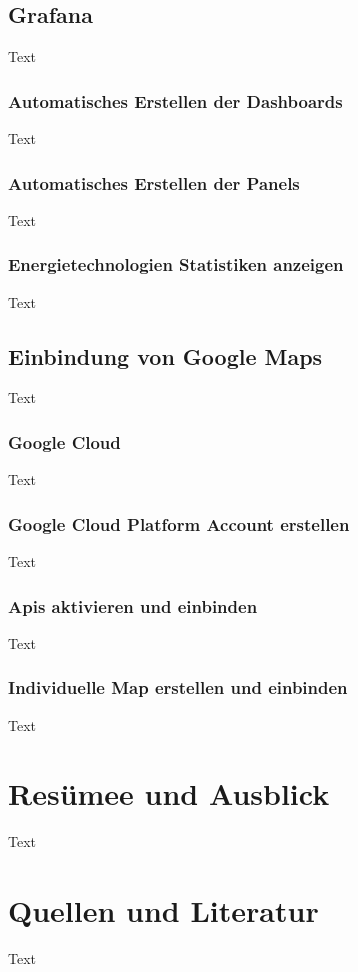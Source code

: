 \section{Grafana}
Text

\subsection{Automatisches Erstellen der Dashboards}
Text

\subsection{Automatisches Erstellen der Panels}
Text

\subsection{Energietechnologien Statistiken anzeigen}
Text



\section{Einbindung von Google Maps}
Text

\subsection{Google Cloud}
Text

\subsection{Google Cloud Platform Account erstellen}
Text

\subsection{Apis aktivieren und einbinden}
Text

\subsection{Individuelle Map erstellen und einbinden}
Text



\chapter{Resümee und Ausblick}
Text


\chapter{Quellen und Literatur}
Text

